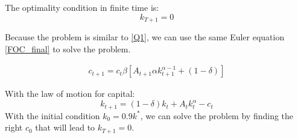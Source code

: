 \documentclass[a4paper,12pt]{article}
\begin{document}
The optimality condition in finite time is: 
\begin{equation}
    k_{T+1} = 0
\end{equation}

Because the problem is similar to \ref{Q1}, we can use the same
Euler equation \eqref{FOC_final} to solve the problem.

\begin{align} 
    c_{t+1} = c_t
    \beta [A_{t+1} \alpha k_{t+1}^{\alpha - 1} + (1 - \delta)] \label{Euler4}
\end{align}

With the law of motion for capital:
\begin{equation}
    k_{t+1} = (1 - \delta) k_t + A_t k_t^\alpha - c_t
\end{equation}
With the initial condition $k_0 = 0.9 k^*$, we can solve the problem by finding 
the right $c_0$ that will lead to $k_{T+1} = 0$.




\end{document}
